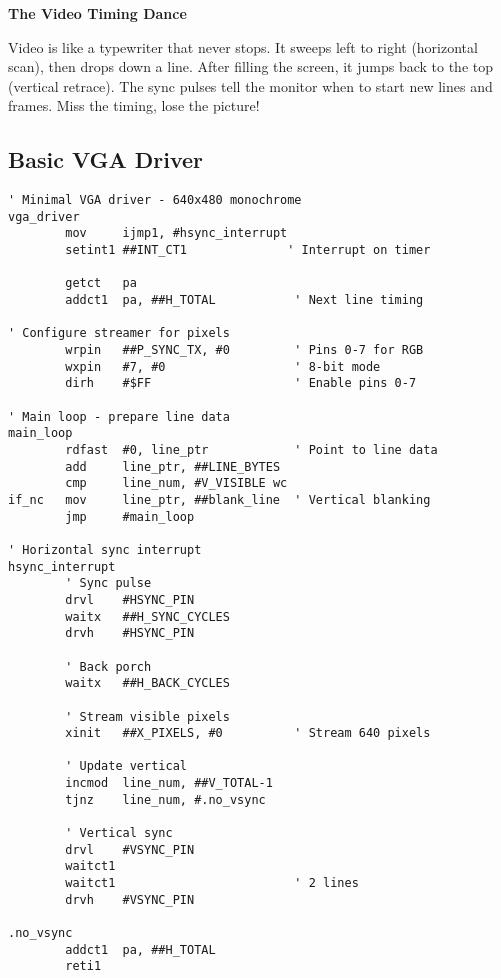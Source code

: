 \documentclass[11pt]{book}
\begin{document}
\begin{sidetrack}
\textbf{The Video Timing Dance}

Video is like a typewriter that never stops. It sweeps left to right (horizontal scan), then drops down a line. After filling the screen, it jumps back to the top (vertical retrace). The sync pulses tell the monitor when to start new lines and frames. Miss the timing, lose the picture!
\end{sidetrack}

\hypertarget{basic-vga-driver}{%
\subsection{Basic VGA Driver}\label{basic-vga-driver}}

\begin{lstlisting}
' Minimal VGA driver - 640x480 monochrome
vga_driver
        mov     ijmp1, #hsync_interrupt
        setint1 ##INT_CT1              ' Interrupt on timer
        
        getct   pa
        addct1  pa, ##H_TOTAL           ' Next line timing
        
' Configure streamer for pixels
        wrpin   ##P_SYNC_TX, #0         ' Pins 0-7 for RGB
        wxpin   #7, #0                  ' 8-bit mode
        dirh    #$FF                    ' Enable pins 0-7
        
' Main loop - prepare line data
main_loop
        rdfast  #0, line_ptr            ' Point to line data
        add     line_ptr, ##LINE_BYTES
        cmp     line_num, #V_VISIBLE wc
if_nc   mov     line_ptr, ##blank_line  ' Vertical blanking
        jmp     #main_loop

' Horizontal sync interrupt
hsync_interrupt
        ' Sync pulse
        drvl    #HSYNC_PIN
        waitx   ##H_SYNC_CYCLES
        drvh    #HSYNC_PIN
        
        ' Back porch
        waitx   ##H_BACK_CYCLES
        
        ' Stream visible pixels
        xinit   ##X_PIXELS, #0          ' Stream 640 pixels
        
        ' Update vertical
        incmod  line_num, ##V_TOTAL-1
        tjnz    line_num, #.no_vsync
        
        ' Vertical sync
        drvl    #VSYNC_PIN
        waitct1
        waitct1                         ' 2 lines
        drvh    #VSYNC_PIN
        
.no_vsync
        addct1  pa, ##H_TOTAL
        reti1
\end{lstlisting}
\end{document}
